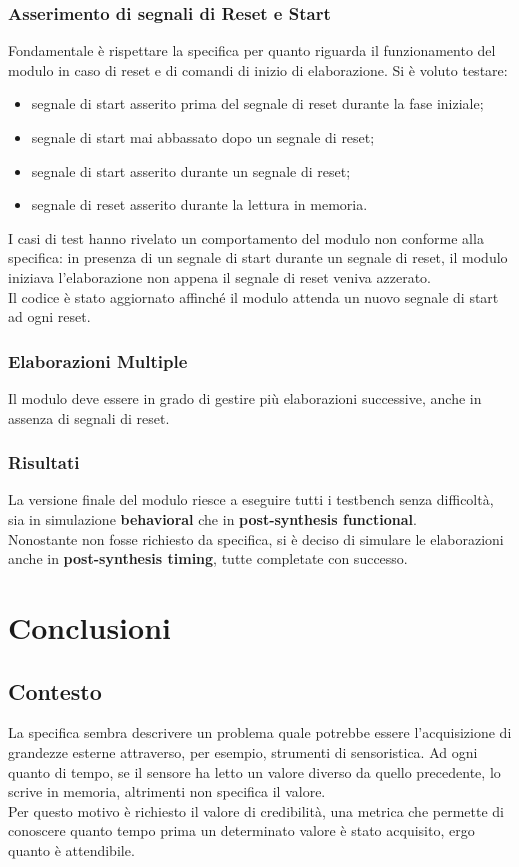 \documentclass{article}
\begin{document}
\subsubsection{Asserimento di segnali di Reset e Start}
    Fondamentale è rispettare la specifica per quanto riguarda il funzionamento del modulo in caso di reset e di comandi di inizio di elaborazione. Si è voluto testare:
    \begin{itemize}[label=\raisebox{0.25ex}{\tiny$\bullet$}]
        \setlength{\itemsep}{0pt}
        \item segnale di start asserito prima del segnale di reset durante la fase iniziale;
        \item segnale di start mai abbassato dopo un segnale di reset;
        \item segnale di start asserito durante un segnale di reset;
        \item segnale di reset asserito durante la lettura in memoria.
    \end{itemize}
    I casi di test hanno rivelato un comportamento del modulo non conforme alla specifica: in presenza di un segnale di start durante un segnale di reset, il modulo iniziava l'elaborazione non appena il segnale di reset veniva azzerato.
    \medskip \\ Il codice è stato aggiornato affinché il modulo attenda un nuovo segnale di start ad ogni reset.
\subsubsection{Elaborazioni Multiple}
Il modulo deve essere in grado di gestire più elaborazioni successive, anche in assenza di segnali di reset. 

\subsubsection{Risultati}
La versione finale del modulo riesce a eseguire tutti i testbench senza difficoltà, sia in simulazione \textbf{behavioral} che in \textbf{post-synthesis functional}.
\medskip \\ Nonostante non fosse richiesto da specifica, si è deciso di simulare le elaborazioni anche in \textbf{post-synthesis timing}, tutte completate con successo. 

\newpage
\section{Conclusioni}
\subsection{Contesto}
La specifica sembra descrivere un problema quale potrebbe essere l'acquisizione di grandezze esterne attraverso, per esempio, strumenti di sensoristica. Ad ogni quanto di tempo, se il sensore ha letto un valore diverso da quello precedente, lo scrive in memoria, altrimenti non specifica il valore.
\medskip \\ Per questo motivo è richiesto il valore di credibilità, una metrica che permette di conoscere quanto tempo prima un determinato valore è stato acquisito, ergo quanto è attendibile.
\end{document}
